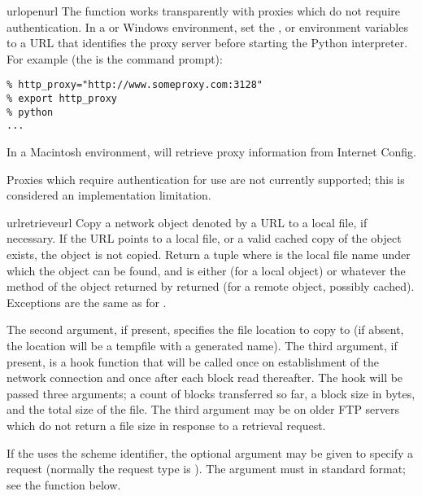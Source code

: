 \begin{funcdesc}{urlopen}{url}
The  function works transparently with proxies
which do not require authentication.  In a \UNIX{} or Windows
environment, set the ,  or
 environment variables to a URL that identifies
the proxy server before starting the Python interpreter.  For example
(the \character{\%} is the command prompt):

\begin{verbatim}
% http_proxy="http://www.someproxy.com:3128"
% export http_proxy
% python
...
\end{verbatim}

In a Macintosh environment,  will retrieve proxy
information from Internet Config.

Proxies which require authentication for use are not currently
supported; this is considered an implementation limitation.
\end{funcdesc}

\begin{funcdesc}{urlretrieve}{url}
Copy a network object denoted by a URL to a local file, if necessary.
If the URL points to a local file, or a valid cached copy of the
object exists, the object is not copied.  Return a tuple
 where  is the
local file name under which the object can be found, and 
is either  (for a local object) or whatever the
 method of the object returned by 
returned (for a remote object, possibly cached).  Exceptions are the
same as for .

The second argument, if present, specifies the file location to copy
to (if absent, the location will be a tempfile with a generated name).
The third argument, if present, is a hook function that will be called
once on establishment of the network connection and once after each
block read thereafter.  The hook will be passed three arguments; a
count of blocks transferred so far, a block size in bytes, and the
total size of the file.  The third argument may be  on older
FTP servers which do not return a file size in response to a retrieval 
request.

If the  uses the  scheme identifier, the optional
 argument may be given to specify a  request
(normally the request type is ).  The  argument
must in standard  format;
see the  function below.
\end{funcdesc}

